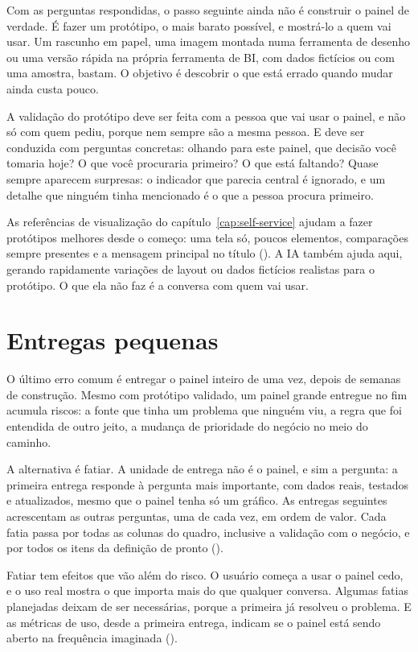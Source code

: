 Com as perguntas respondidas, o passo seguinte ainda não é construir o painel de verdade. É
fazer um protótipo, o mais barato possível, e mostrá-lo a quem vai usar. Um rascunho em papel,
uma imagem montada numa ferramenta de desenho ou uma versão rápida na própria ferramenta de
BI, com dados fictícios ou com uma amostra, bastam. O objetivo é descobrir o que está errado
quando mudar ainda custa pouco.

A validação do protótipo deve ser feita com a pessoa que vai usar o painel, e não só com quem
pediu, porque nem sempre são a mesma pessoa. E deve ser conduzida com perguntas concretas:
olhando para este painel, que decisão você tomaria hoje? O que você procuraria primeiro? O que
está faltando? Quase sempre aparecem surpresas: o indicador que parecia central é ignorado, e
um detalhe que ninguém tinha mencionado é o que a pessoa procura primeiro.

As referências de visualização do capítulo~\ref{cap:self-service} ajudam a fazer protótipos
melhores desde o começo: uma tela só, poucos elementos, comparações sempre presentes e a
mensagem principal no título (). A IA também ajuda aqui, gerando
rapidamente variações de layout ou dados fictícios realistas para o protótipo. O que ela não
faz é a conversa com quem vai usar.

\section{Entregas pequenas}
\label{sec:fatiar-dashboard}

O último erro comum é entregar o painel inteiro de uma vez, depois de semanas de construção.
Mesmo com protótipo validado, um painel grande entregue no fim acumula riscos: a fonte que
tinha um problema que ninguém viu, a regra que foi entendida de outro jeito, a mudança de
prioridade do negócio no meio do caminho.

A alternativa é fatiar. A unidade de entrega não é o painel, e sim a pergunta: a primeira
entrega responde à pergunta mais importante, com dados reais, testados e atualizados, mesmo
que o painel tenha só um gráfico. As entregas seguintes acrescentam as outras perguntas, uma de
cada vez, em ordem de valor. Cada fatia passa por todas as colunas do quadro, inclusive a
validação com o negócio, e por todos os itens da definição de pronto
().

Fatiar tem efeitos que vão além do risco. O usuário começa a usar o painel cedo, e o uso real
mostra o que importa mais do que qualquer conversa. Algumas fatias planejadas deixam de ser
necessárias, porque a primeira já resolveu o problema. E as métricas de uso, desde a primeira
entrega, indicam se o painel está sendo aberto na frequência imaginada
().

